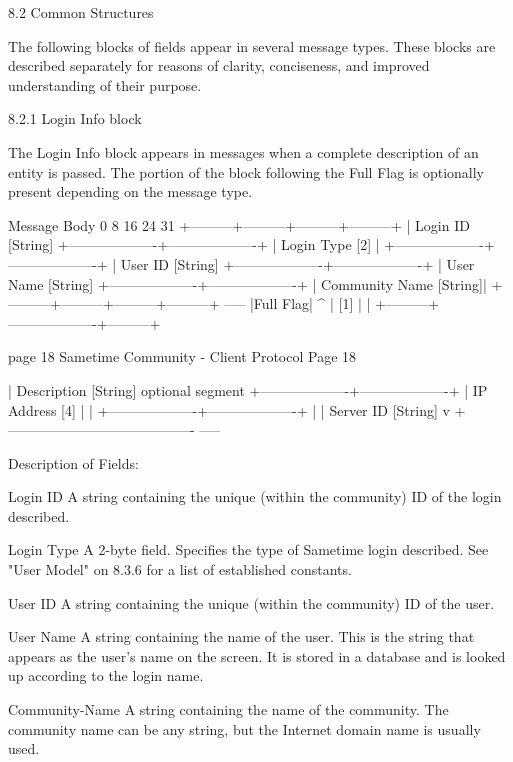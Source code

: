 \documentclass[titlepage,oneside]{book}
\begin{document}
8.2 Common Structures

The following blocks of fields appear in several message types. These
blocks are described separately for reasons of clarity, conciseness,
and improved understanding of their purpose.

8.2.1 Login Info block

The Login Info block appears in messages when a complete description of
an entity is passed. The portion of the block following the Full Flag
is optionally present depending on the message type.

Message Body
0         8         16        24      31
+---------+---------+---------+---------+
| Login ID [String]
+-------------------+-------------------+
|  Login Type [2]   |
+-------------------+-------------------+
| User ID [String]
+-------------------+-------------------+
| User Name [String]
+-------------------+-------------------+
| Community Name [String]|
+---------+---------+---------+---------+          -----
|Full Flag|                                          ^
|    [1]  |                                          |
+---------+-------------------+---------+

page 18  Sametime Community - Client Protocol   Page 18

| Description [String]                       optional segment
+-------------------+-------------------+
|            IP Address [4]             |            |
+-------------------+-------------------+            |
| Server ID [String]                                 v
+----------------------------------------          -----

Description of Fields:

Login ID
  A string containing the unique (within the community) ID of the
  login described.

Login Type
  A 2-byte field. Specifies the type of Sametime login described. See
  "User Model" on 8.3.6 for a list of established constants.

User ID
  A string containing the unique (within the community) ID of the
  user.

User Name
  A string containing the name of the user. This is the string that
  appears as the user's name on the screen. It is stored in a
  database and is looked up according to the login name.

Community-Name
  A string containing the name of the community. The community name
  can be any string, but the Internet domain name is usually used.
\end{document}
